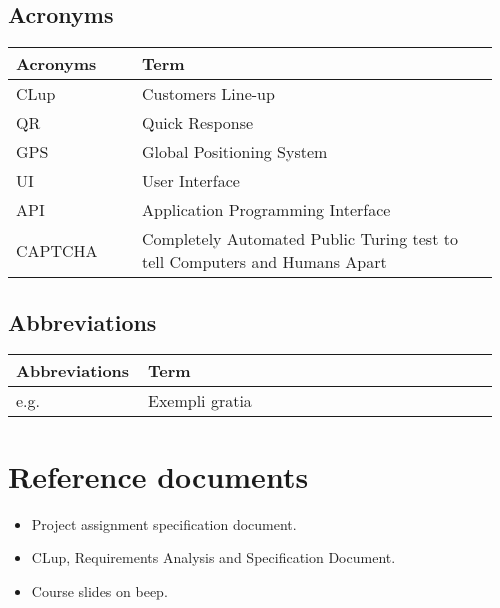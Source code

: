 \subsection{Acronyms}
\begin{center}
	\begin{tabular}{@{}p{0.25\linewidth} p{0.71\linewidth}@{}}
		\toprule
		\textbf{Acronyms} & \textbf{Term}\\
		\midrule
		CLup & Customers Line-up\\
		QR & Quick Response\\
		GPS & Global Positioning System\\
		UI & User Interface\\
		API & Application Programming Interface\\
		CAPTCHA & Completely Automated Public Turing test to tell Computers and Humans Apart\\
		\bottomrule
	\end{tabular}
\end{center}

\subsection{Abbreviations}
\begin{center}
	\begin{tabular}{@{}p{0.25\linewidth} p{0.71\linewidth}@{}}
		\toprule
		\textbf{Abbreviations} & \textbf{Term}\\
		\midrule
		e.g. & Exempli gratia\\
		\bottomrule
	\end{tabular}
\end{center}

\section{Reference documents}
\begin{itemize}
	\item Project assignment specification document.
    \item CLup, Requirements Analysis and Specification Document.
	\item Course slides on beep.
\end{itemize}

